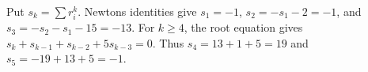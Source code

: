 Put $s_k=\sum r_i^k$. Newton\textquotesingle s identities give $s_1=-1$, $s_2=-s_1-2=-1$, and $s_3=-s_2-s_1-15=-13$. For $k\ge4$, the root equation gives $s_k+s_{k-1}+s_{k-2}+5s_{k-3}=0$. Thus $s_4=13+1+5=19$ and $s_5=-19+13+5=\boxed{-1}$.

